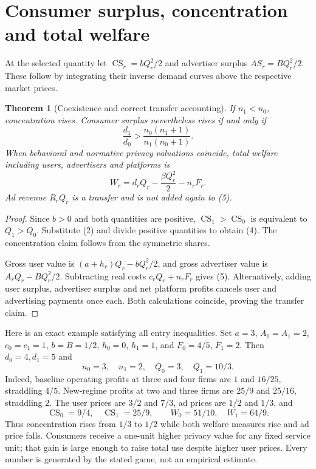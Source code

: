 \documentclass[11pt]{article}
\newtheorem{theorem}{Theorem}
\theoremstyle{remark}
\newcommand{\CS}{\operatorname{CS}}
\begin{document}
\section{Consumer surplus, concentration and total welfare}
At the selected quantity let $\CS_r=bQ_r^2/2$ and advertiser surplus $AS_r=BQ_r^2/2$. These follow by integrating their inverse demand curves above the respective market prices.

\begin{theorem}[Coexistence and correct transfer accounting]
If $n_1<n_0$, concentration rises. Consumer surplus nevertheless rises if and only if
\[
 \frac{d_1}{d_0}>
 \frac{n_0(n_1+1)}{n_1(n_0+1)}.                         \tag{4}
\]
When behavioral and normative privacy valuations coincide, total welfare including users, advertisers and platforms is
\[
 W_r=d_rQ_r-\frac{\beta Q_r^2}{2}-n_rF_r.                \tag{5}
\]
Ad revenue $R_rQ_r$ is a transfer and is not added again to (5).
\end{theorem}
\begin{proof}
Since $b>0$ and both quantities are positive, $\CS_1>\CS_0$ is equivalent to $Q_1>Q_0$. Substitute (2) and divide positive quantities to obtain (4). The concentration claim follows from the symmetric shares.

Gross user value is $(a+h_r)Q_r-bQ_r^2/2$, and gross advertiser value is $A_rQ_r-BQ_r^2/2$. Subtracting real costs $c_rQ_r+n_rF_r$ gives (5). Alternatively, adding user surplus, advertiser surplus and net platform profits cancels user and advertising payments once each. Both calculations coincide, proving the transfer claim.
\end{proof}

Here is an exact example satisfying all entry inequalities. Set $a=3$, $A_0=A_1=2$, $c_0=c_1=1$, $b=B=1/2$, $h_0=0$, $h_1=1$, and $F_0=4/5$, $F_1=2$. Then $d_0=4,d_1=5$ and
\[
 n_0=3,\quad n_1=2,\quad Q_0=3,\quad Q_1=10/3.
\]
Indeed, baseline operating profits at three and four firms are $1$ and $16/25$, straddling $4/5$. New-regime profits at two and three firms are $25/9$ and $25/16$, straddling $2$. The user prices are $3/2$ and $7/3$, ad prices are $1/2$ and $1/3$, and
\[
 \CS_0=9/4,\quad\CS_1=25/9,\qquad
 W_0=51/10,\quad W_1=64/9.
\]
Thus concentration rises from $1/3$ to $1/2$ while both welfare measures rise and ad price falls. Consumers receive a one-unit higher privacy value for any fixed service unit; that gain is large enough to raise total use despite higher user prices. Every number is generated by the stated game, not an empirical estimate.
\end{document}
